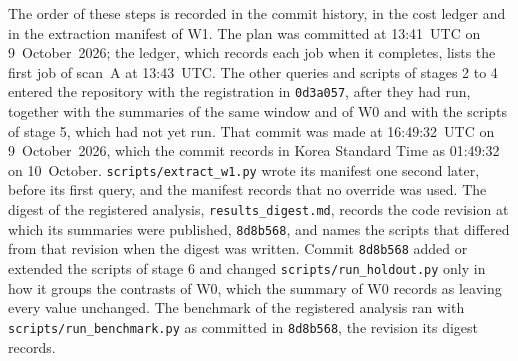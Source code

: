 The order of these steps is recorded in the commit history, in the cost ledger and in the extraction manifest of W1. The plan was committed at 13:41~UTC on 9~October~2026; the ledger, which records each job when it completes, lists the first job of scan~A at 13:43~UTC. The other queries and scripts of stages 2 to 4 entered the repository with the registration in \texttt{0d3a057}, after they had run, together with the summaries of the same window and of W0 and with the scripts of stage 5, which had not yet run. That commit was made at 16:49:32~UTC on 9~October~2026, which the commit records in Korea Standard Time as 01:49:32 on 10~October. \texttt{scripts/extract\_w1.py} wrote its manifest one second later, before its first query, and the manifest records that no override was used. The digest of the registered analysis, \texttt{results\_digest.md}, records the code revision at which its summaries were published, \texttt{8d8b568}, and names the scripts that differed from that revision when the digest was written. Commit \texttt{8d8b568} added or extended the scripts of stage 6 and changed \texttt{scripts/run\_holdout.py} only in how it groups the contrasts of W0, which the summary of W0 records as leaving every value unchanged. The benchmark of the registered analysis ran with \texttt{scripts/run\_benchmark.py} as committed in \texttt{8d8b568}, the revision its digest records.

